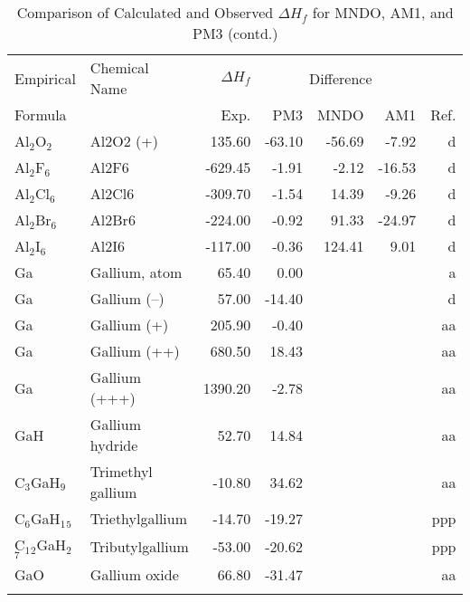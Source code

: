 \begin{table}
\caption{Comparison of Calculated and Observed $\Delta H_f$ 
for MNDO, AM1, and PM3 (contd.)}
\begin{center}
\compresstable
\begin{tabular}{llrrrrr}
Empirical & Chemical Name & $\Delta H_f$ & \multicolumn{3}{c}{Difference} & \\
Formula   &               & Exp. & PM3 &  MNDO  &  AM1 &     Ref.\\
\hline
 Al$_2$O$_2$       & Al2O2  (+)                             &   135.60    &   -63.10  &   -56.69  &    -7.92  &      d\\
 Al$_2$F$_6$       & Al2F6                                  &  -629.45    &    -1.91  &    -2.12  &   -16.53  &      d\\
 Al$_2$Cl$_6$      & Al2Cl6                                 &  -309.70    &    -1.54  &    14.39  &    -9.26  &      d\\
 Al$_2$Br$_6$      & Al2Br6                                 &  -224.00    &    -0.92  &    91.33  &   -24.97  &      d\\
 Al$_2$I$_6$       & Al2I6                                  &  -117.00    &    -0.36  &   124.41  &     9.01  &      d\\
 Ga          & Gallium, atom                          &    65.40    &     0.00  &  &  &      a\\
 Ga          & Gallium (--)                            &    57.00    &   -14.40  &  &  &      d\\
 Ga          & Gallium (+)                            &   205.90    &    -0.40  &  &  &     aa\\
 Ga          & Gallium (++)                           &   680.50    &    18.43  &  &  &     aa\\
 Ga          & Gallium (+++)                          &  1390.20    &    -2.78  &  &  &     aa\\
 GaH         & Gallium hydride                        &    52.70    &    14.84  &  &  &     aa\\
 C$_3$GaH$_9$      & Trimethyl gallium                      &   -10.80    &    34.62  &  &  &     aa\\
 C$_6$GaH$_1$$_5$     & Triethylgallium                        &   -14.70    &   -19.27  &  &  &    ppp\\
 C$_1$$_2$GaH$_2$$_7$    & Tributylgallium                        &   -53.00    &   -20.62  &  &  &    ppp\\
 GaO         & Gallium oxide                          &    66.80    &   -31.47  &  &  &     aa\\
$$
\end{tabular}
\end{center}
\end{table}

